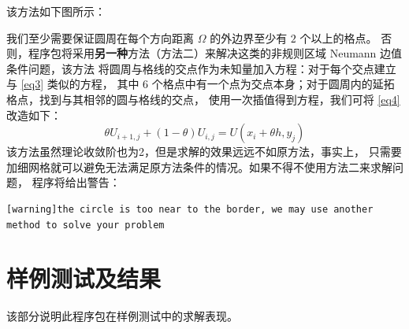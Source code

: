 \documentclass[lang=cn,a4paper,newtx,bibend=bibtex]{elegantpaper}
\begin{document}
该方法如下图所示：

\begin{figure}[H]
  \centering
\end{figure}

我们至少需要保证圆周在每个方向距离 $\Omega$ 的外边界至少有 $2$ 个以上的格点。
否则，程序包将采用\textbf{另一种}方法（方法二）来解决这类的非规则区域 Neumann 边值条件问题，该方法
将圆周与格线的交点作为未知量加入方程：对于每个交点建立与 \eqref{eq3} 类似的方程，
其中 $6$ 个格点中有一个点为交点本身；对于圆周内的延拓格点，找到与其相邻的圆与格线的交点，
使用一次插值得到方程，我们可将 \eqref{eq4} 改造如下：
\begin{equation}
  \theta U_{i+1, j} + (1 - \theta) U_{i,j} = U(x_i + \theta h, y_j)
\end{equation}
该方法虽然理论收敛阶也为2，但是求解的效果远远不如原方法，事实上，
只需要加细网格就可以避免无法满足原方法条件的情况。如果不得不使用方法二来求解问题，
程序将给出警告：

\begin{lstlisting}
[warning]the circle is too near to the border, we may use another method to solve your problem
\end{lstlisting}



\section{样例测试及结果}

该部分说明此程序包在样例测试中的求解表现。
\end{document}
